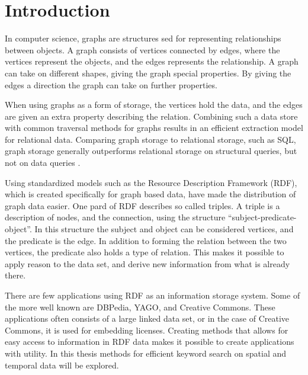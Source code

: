 \chapter{Introduction}
\label{cha:Introduction}

In computer science, graphs are structures sed for representing relationships between objects. A graph consists of vertices connected by edges, where the vertices represent the objects, and the edges represents the relationship. A graph can take on different shapes, giving the graph special properties. By giving the edges a direction the graph can take on further properties.

When using graphs as a form of storage, the vertices hold the data, and the edges are given an extra property describing the relation. Combining such a data store with common traversal methods for graphs results in an efficient extraction model for relational data. Comparing graph storage to relational storage, such as SQL, graph storage generally outperforms relational storage on structural queries, but not on data queries \cite{AComparisonOfGraphAndRelDB}.

Using standardized models such as the Resource Description Framework (RDF), which is created specifically for graph based data, have made the distribution of graph data easier. One pard of RDF describes so called triples. A triple is a description of nodes, and the connection, using the structure ``subject-predicate-object''. In this structure the subject and object can be considered vertices, and the predicate is the edge. In addition to forming the relation between the two vertices, the predicate also holds a type of relation. This makes it possible to apply reason to the data set, and derive new information from what is already there.

There are few applications using RDF as an information storage system. Some of the more well known are DBPedia\cite{dbpedia}, YAGO\cite{yago}, and Creative Commons. These applications often consists of a large linked data set, or in the case of Creative Commons, it is used for embedding licenses. Creating methods that allows for easy access to information in RDF data makes it possible to create applications with utility. In this thesis methods for efficient keyword search on spatial and temporal data will be explored.

